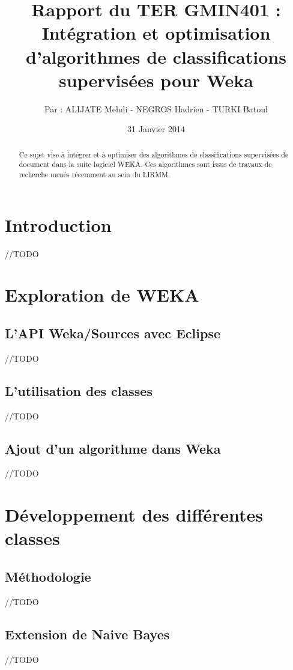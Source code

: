 \documentclass{article}
\title{Rapport du TER GMIN401 :\\ \textbf{Intégration et optimisation d’algorithmes de classifications supervisées pour Weka}}
\author{Par : ALIJATE Mehdi - NEGROS Hadrien - TURKI Batoul}
\date{31 Janvier 2014}
\begin{document}
\maketitle
\tableofcontents

\begin{abstract}
	
Ce sujet vise à intégrer et à optimiser des algorithmes de classifications supervisées de document dans la suite logiciel WEKA. Ces algorithmes sont issus de travaux de recherche menés récemment au sein du LIRMM.
\end{abstract}

\newpage 
\section{Introduction}\label{sec:intro}
//TODO


\section{Exploration de WEKA}

\subsection{L'API Weka/Sources avec Eclipse}
//TODO

\subsection{L'utilisation des classes}
//TODO
\subsection{Ajout d'un algorithme dans Weka}
//TODO

\section{Développement des différentes classes}

\subsection{Méthodologie}
//TODO
\subsection{Extension de Naive Bayes}
//TODO
\end{document}
